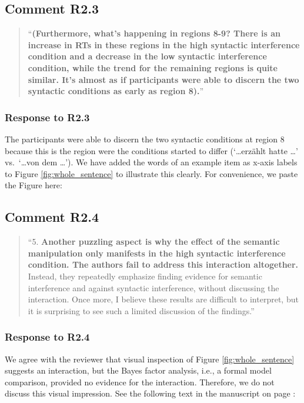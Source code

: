 \documentclass[12pt]{article}
\begin{document}
\subsection*{Comment R2.3}
\begin{quote}
``\textbf{(Furthermore, what's happening in regions 8-9? There is an increase in RTs in these regions in the high syntactic interference condition and a decrease in the low syntactic interference condition, while the trend for the remaining regions is quite similar. It's almost as if participants were able to discern the two syntactic conditions as early as region 8).}''
\end{quote}

\subsubsection*{Response to R2.3}
The participants were able to discern the two syntactic conditions at region 8 because this is the region were the conditions started to differ (`\dots erzählt hatte \dots' vs.\ `\dots von dem \dots'). We have added the words of an example item as x-axis labels to Figure \ref{fig:whole_sentence} to illustrate this clearly. For convenience, we paste the Figure here:

\setcounter{figure}{2}


\newpage

\subsection*{Comment R2.4}
\begin{quote}
``5. \textbf{Another puzzling aspect is why the effect of the semantic manipulation only manifests in the high syntactic interference condition. The authors fail to address this interaction altogether.} Instead, they repeatedly emphasize finding evidence for semantic interference and against syntactic interference, without discussing the interaction. Once more, I believe these results are difficult to interpret, but it is surprising to see such a limited discussion of the findings.''
\end{quote}

\subsubsection*{Response to R2.4}
We agree with the reviewer that visual inspection of Figure \ref{fig:whole_sentence} suggests an interaction, but the Bayes factor analysis, i.e., a formal model comparison, provided no evidence for the interaction. Therefore, we do not discuss this visual impression. See the following text in the manuscript on page \pageref{insig_interaction}:
\end{document}
